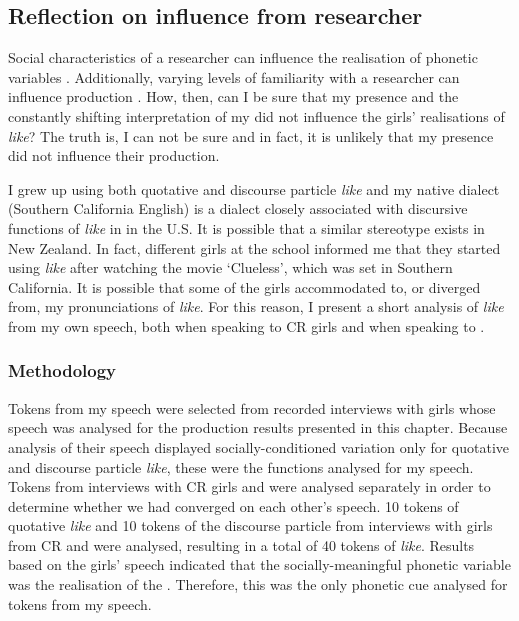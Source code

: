\subsection{Reflection on influence from researcher}

Social characteristics of a researcher can influence the realisation of phonetic variables \citep{rickfordetal1994}. Additionally, varying levels of familiarity with a researcher can influence production \citep{cukoravilabailey}. How, then, can I be sure that my presence and the constantly shifting interpretation of my  did not influence the girls' realisations of \textit{like}? The truth is, I can not be sure and in fact, it is unlikely that my presence did not influence their production.

I grew up using both quotative and discourse particle \textit{like} and my native dialect (Southern California English) is a dialect closely associated with discursive functions of \textit{like} in  in the U.S. It is possible that a similar stereotype exists in New Zealand. In fact, different girls at the school informed me that they started using \textit{like} after watching the movie `Clueless', which was set in Southern California. It is possible that some of the girls accommodated to, or diverged from, my pronunciations of \textit{like}. For this reason, I present a short analysis of \textit{like} from my own speech, both when speaking to CR girls and when speaking to .

\subsubsection{Methodology}
Tokens from my speech were selected from recorded interviews with girls whose speech was analysed for the production results presented in this chapter. Because analysis of their speech displayed socially-conditioned variation only for quotative and discourse particle \textit{like}, these were the functions analysed for my speech. Tokens from interviews with CR girls and  were analysed separately in order to determine whether we had converged on each other's speech. 10 tokens of quotative \textit{like} and 10 tokens of the discourse particle from interviews with girls from CR and  were analysed, resulting in a total of 40 tokens of \textit{like}. Results based on the girls' speech indicated that the socially-meaningful phonetic variable was the realisation of the . Therefore, this was the only phonetic cue analysed for tokens from my speech.

